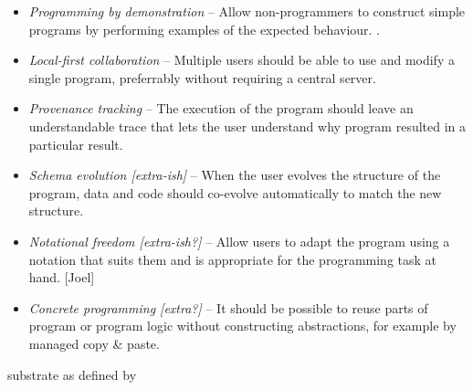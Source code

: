 \documentclass[sigconf]{acmart}
\begin{document}
\begin{itemize}
\item \emph{Programming by demonstration} --
  Allow non-programmers to construct simple programs by performing examples of the expected behaviour. \cite{leiva-2021-rapido}.
\item \emph{Local-first collaboration} --
  Multiple users should be able to use and modify a single program, preferrably without requiring a central server. \cite{kleppmann-2019-local}
\item \emph{Provenance tracking} --
  The execution of the program should leave an understandable trace that lets the user understand why program resulted in a particular result.
\item \emph{Schema evolution [extra-ish]} --
  When the user evolves the structure of the program, data and code should co-evolve automatically to match the new structure.
\item \emph{Notational freedom [extra-ish?]} --
  Allow users to adapt the program using a notation that suits them and is appropriate for the programming task at hand. [Joel]
\item \emph{Concrete programming [extra?]} --
  It should be possible to reuse parts of program or program logic without constructing abstractions, for example by managed copy \& paste.\cite{edwards-2006-copypaste,edwards-2022-copypaste}
\end{itemize}

substrate as defined by \cite{jakubovic-2022-ladder}

\cite{leiva-2021-rapido,cypher-1993-pbd}
\cite{chen-2023-miwa}

\cite{kleppmann-2019-local,klokmose-2024-mywebstrates}
\cite{ko-2004-whyline,ko-2009-whyline,krebs-2023-probelog}
\cite{ricciotti-2017-imperative,perera-2012-functional}
\cite{perera-2022-linked}







\end{document}
